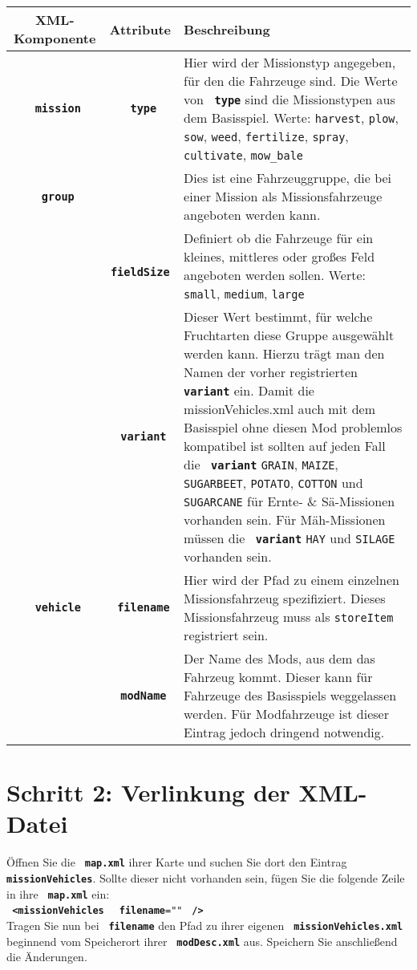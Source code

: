 \documentclass[a4paper]{scrartcl}
\newcommand{\XML}[1]{\texttt{\textbf{\color{pblue} #1}}}
\newcommand{\Attr}[1]{\texttt{\textbf{\color{pgreen} #1}}}
\newcommand{\Datei}[1]{\texttt{\textbf{\color{datei} #1}}}
\newcommand{\icon}[1]{
	\hspace{-2mm}
	\faIcon[solid]{#1}
	\hspace{-2mm}
}
\newcommand{\warning}{{\color{pred}\icon{exclamation-triangle}}}
\begin{document}
		\begin{tabular}{c|c|p{9cm}}
			\textbf{XML-Komponente} & \textbf{Attribute} & \textbf{Beschreibung}\\
			\hline
			\XML{mission} & \Attr{type} &
			Hier wird der Missionstyp angegeben, für den die Fahrzeuge sind. Die Werte von \Attr{type} sind die Missionstypen aus dem Basisspiel.\newline
			Werte: \texttt{harvest}, \texttt{plow}, \texttt{sow}, \texttt{weed}, \texttt{fertilize}, \texttt{spray}, \texttt{cultivate}, \texttt{mow\_bale}\\
			\hline
			\XML{group} & & Dies ist eine Fahrzeuggruppe, die bei einer Mission als Missionsfahrzeuge angeboten werden kann.\\
			\hdashline
			& \Attr{fieldSize} & Definiert ob die Fahrzeuge für ein kleines, mittleres oder großes Feld angeboten werden sollen.\newline
			Werte: \texttt{small}, \texttt{medium}, \texttt{large}\\
			\hdashline
			& \Attr{variant} & Dieser Wert bestimmt, für welche Fruchtarten diese Gruppe ausgewählt werden kann. Hierzu trägt man den Namen der vorher registrierten \XML{variant} ein.\newline
			\warning Damit die missionVehicles.xml auch mit dem Basisspiel ohne diesen Mod problemlos kompatibel ist sollten auf jeden Fall die \XML{variant} \texttt{GRAIN}, \texttt{MAIZE}, \texttt{SUGARBEET}, \texttt{POTATO}, \texttt{COTTON} und \texttt{SUGARCANE} für Ernte- \& Sä-Missionen vorhanden sein.\newline
			\warning Für Mäh-Missionen müssen die \XML{variant} \texttt{HAY} und \texttt{SILAGE} vorhanden sein.\\
			\hline
			\XML{vehicle} & \Attr{filename} & Hier wird der Pfad zu einem einzelnen Missionsfahrzeug spezifiziert. Dieses  Missionsfahrzeug muss als \texttt{storeItem} registriert sein.\\
			\hdashline
			& \Attr{modName} & Der Name des Mods, aus dem das Fahrzeug kommt. Dieser kann für Fahrzeuge des Basisspiels weggelassen werden. Für Modfahrzeuge ist dieser Eintrag jedoch dringend notwendig.
		\end{tabular}

	\section*{Schritt 2: Verlinkung der XML-Datei}
		Öffnen Sie die \Datei{map.xml} ihrer Karte und suchen Sie dort den Eintrag \XML{missionVehicles}. Sollte dieser nicht vorhanden sein, fügen Sie die folgende Zeile in ihre \Datei{map.xml} ein:\\
		\XML{<missionVehicles } \Attr{filename}\texttt{="}\texttt{"} \XML{/>}\\
		Tragen Sie nun bei \Attr{filename} den Pfad zu ihrer eigenen \Datei{missionVehicles.xml} beginnend vom Speicherort ihrer \Datei{modDesc.xml} aus. Speichern Sie anschließend die Änderungen.
	\newpage
\end{document}
